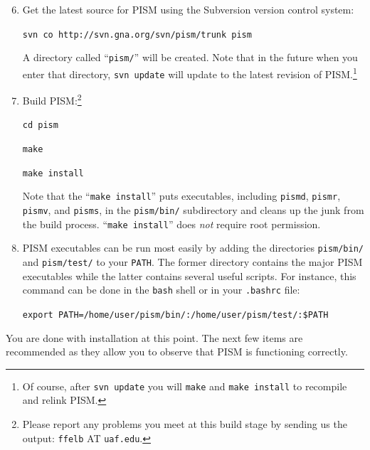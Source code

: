 \documentclass[11pt,final]{amsart}
\renewcommand{\t}[1]{\texttt{#1}}
\begin{document}
\begin{enumerate}\setcounter{enumi}{5}
\item \label{getPISMstep} Get the latest source for PISM using the Subversion version control system:

\verb|svn co http://svn.gna.org/svn/pism/trunk pism|

\noindent A directory called ``\verb|pism/|'' will be created.  Note that in the future when you enter that directory, \verb|svn update| will update to the latest revision of PISM.\footnote{Of course, after \t{svn update} you will \t{make} and \t{make install} to recompile and relink PISM.}

\item Build PISM:\footnote{Please report any problems you meet at this build stage by sending us the output: \t{ffelb} AT \t{uaf.edu}.}

\verb|cd pism|

\verb|make|

\verb|make install|

\noindent  Note that the ``\verb|make install|'' puts executables, including \verb|pismd|, \verb|pismr|, \verb|pismv|, and \verb|pisms|, in the \verb|pism/bin/| subdirectory and cleans up the junk from the build process.  ``\verb|make install|'' does \emph{not} require root permission.

\item PISM executables can be run most easily by adding the directories \verb|pism/bin/| and \verb|pism/test/| to your \verb|PATH|.  The former directory contains the major PISM executables while the latter contains several useful scripts.  For instance, this command can be done in the \verb|bash| shell or in your \verb|.bashrc| file:

\verb|export PATH=/home/user/pism/bin/:/home/user/pism/test/:$PATH|
\end{enumerate}

\bigskip
You are done with installation at this point.  The next few items are recommended as they allow you to observe that PISM is functioning correctly.
\bigskip
\end{document}
